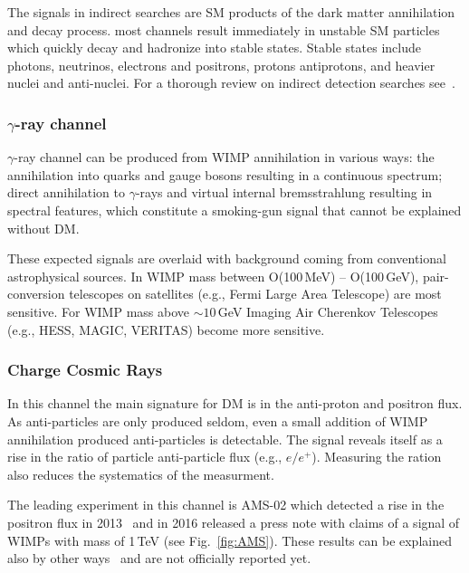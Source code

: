 The signals in indirect searches are SM products of the dark matter annihilation and decay process. most channels result immediately in unstable SM particles which quickly decay and hadronize into stable states. Stable states include photons, neutrinos, electrons and positrons, protons antiprotons, and heavier nuclei and anti-nuclei. For a thorough review on indirect detection searches see~\cite{Conrad:2014tla}.

\subsubsection{$\gamma$-ray channel}

$\gamma$-ray channel can be produced from WIMP annihilation in various ways: the annihilation into quarks and gauge bosons resulting in a continuous spectrum; direct annihilation to $\gamma$-rays and virtual internal bremsstrahlung resulting in spectral features, which constitute a smoking-gun signal that cannot be explained without DM.

These expected signals are overlaid with background coming from conventional astrophysical sources. In WIMP mass between O(100\,MeV) -- O(100\,GeV), pair-conversion telescopes on satellites (e.g., Fermi Large Area Telescope) are most sensitive. For WIMP mass above $\sim 10$\,GeV Imaging Air Cherenkov Telescopes (e.g., HESS, MAGIC, VERITAS) become more sensitive.

\subsubsection{Charge Cosmic Rays}

In this channel the main signature for DM is in the anti-proton and positron flux. As anti-particles are  only produced seldom, even a small addition of WIMP annihilation produced anti-particles is detectable. The signal reveals itself as a rise in the ratio of particle anti-particle flux (e.g., $e/e^+$). Measuring the ration also reduces the systematics of the measurment.  

The leading experiment in this channel is AMS-02 which detected a rise in the positron flux in 2013~\cite{Aguilar:2013qda} and in 2016 released a press note with claims of a signal of WIMPs with mass of 1\,TeV (see Fig.~\ref{fig:AMS}). These results can be explained also by other ways~\cite{Blum:2013zsa} and are not officially reported yet. 

